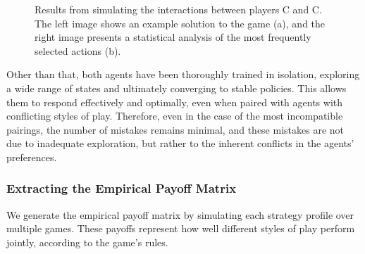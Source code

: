 \begin{figure}[H]
\begin{subfigure}[b]{0.45\textwidth}
                \caption{}
                \label{fig:cc-stats}
            \end{subfigure}
            \caption{Results from simulating the interactions between players C and C. The left image shows an example solution to the game (a), and the right image presents a statistical analysis of the most frequently selected actions (b).}
            \label{fig:cc-simulation}
        \end{figure}

        \noindent
        Other than that, both agents have been thoroughly trained in isolation, exploring a wide range of states and ultimately converging to stable policies. This allows them to respond effectively and optimally, even when paired with agents with conflicting styles of play. Therefore, even in the case of the most incompatible pairings, the number of mistakes remains minimal, and these mistakes are not due to inadequate exploration, but rather to the inherent conflicts in the agents’ preferences. 

    \subsubsection{Extracting the Empirical Payoff Matrix}

        We generate the empirical payoff matrix by simulating each strategy profile over multiple games. These payoffs represent how well different styles of play perform jointly, according to the game’s rules.\tinydouble

